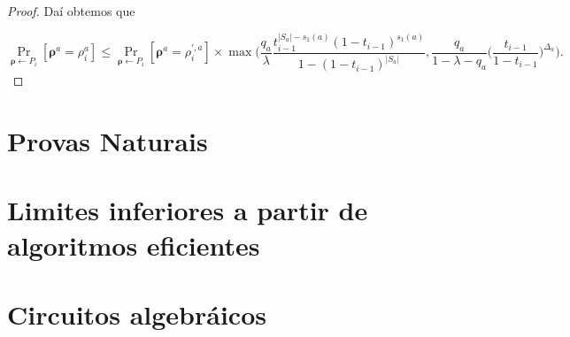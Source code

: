 \begin{proof}
	Daí obtemos que
	
	\begin{equation*}
		\Pr_{\boldsymbol{\rho} \leftarrow P_{i}}[\boldsymbol{\rho}^{a} = \rho_{i}^{a}] \leq \Pr_{\boldsymbol{\rho} \leftarrow P_{i}}[\boldsymbol{\rho}^{a} = \rho_{i}^{\prime, a}] \times \max \Bigg( \frac{q_{a}}{\lambda}\frac{t_{i - 1}^{\lvert S_{a} \rvert - s_{1}(a)}(1 - t_{i - 1})^{s_{1}(a)}}{1 - (1 - t_{i - 1})^{\lvert S_{a} \rvert}}, \frac{q_{a}}{1 - \lambda - q_{a}} \bigg( \frac{t_{i - 1}}{1 - t_{i - 1}}\bigg)^{\Delta_{a}} \Bigg).
	\end{equation*}

\end{proof}


\section{Provas Naturais}

\section{Limites inferiores a partir de algoritmos eficientes}

\section{Circuitos algebráicos}